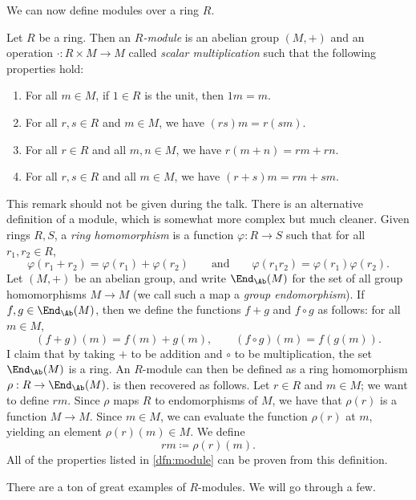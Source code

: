 We can now define modules over a ring $R$.

\begin{definition}\label{dfn:module}
	Let $R$ be a ring. Then an \emph{$R$-module} is an abelian group $(M,+)$ and an operation $\cdot : R\times M \to M$ called \emph{scalar multiplication} such that the following properties hold:
	\begin{enumerate}
		\item For all $m\in M$, if $1\in R$ is the unit, then $1m=m$.
		\item For all $r,s\in R$ and $m\in M$, we have $(rs)m=r(sm)$.
		\item For all $r\in R$ and all $m,n\in M$, we have $r(m+n)=r m+rn$.
		\item For all $r,s\in R$ and all $m\in M$, we have $(r+s)m=r m+sm$.
	\end{enumerate}
\end{definition}

\begin{remark}\label{rmk:modules-as-morphisms}
	This remark should not be given during the talk. There is an alternative definition of a module, which is somewhat more complex but much cleaner. Given rings $R,S$, a \emph{ring homomorphism} is a function $\varphi : R \to S$ such that for all $r_1,r_2\in R$,
	\[
		\varphi (r_1+r_2) = \varphi (r_1)+\varphi (r_2)\qquad \text{and} \qquad \varphi (r_1r_2)=\varphi (r_1)\varphi (r_2)
	.\]
	Let $(M,+)$ be an abelian group, and write $\End_{\Ab }(M) $ for the set of all group homomorphisms $M\to M$ (we call such a map a \emph{group endomorphism}). If $f,g\in \End_{\Ab } (M)$, then we define the functions $f+g$ and $f\circ g$ as follows: for all $m\in M$,
	\[
		(f+g)(m) = f(m)+g(m),\qquad (f\circ g)(m) = f(g(m))
	.\]
	I claim that by taking $+$ to be addition and $\circ $ to be multiplication, the set $\End_{\Ab }(M) $ is a ring. An $R$-module can then be defined as a ring homomorphism $\rho : R \to \End_{\Ab }(M) $.  is then recovered as follows. Let $r\in R$ and $m\in M$; we want to define $r m$. Since $\rho $ maps $R$ to endomorphisms of $M$, we have that $\rho (r)$ is a function $M\to M$. Since $m\in M$, we can evaluate the function $\rho (r)$ at $m$, yielding an element $\rho (r)(m)\in M$. We define
	\[
		r m\coloneqq \rho (r)(m)
	.\]
	All of the properties listed in \cref{dfn:module} can be proven from this definition.
\end{remark}

There are a ton of great examples of $R$-modules. We will go through a few.

